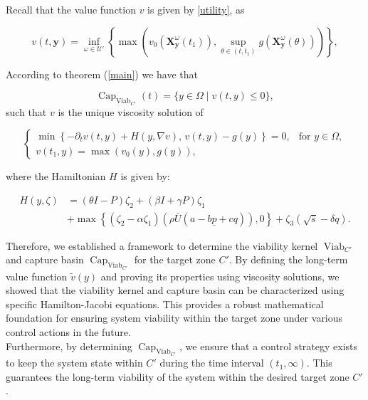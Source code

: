 \documentclass[]{interact}
\theoremstyle{plain}%
\theoremstyle{definition}
\theoremstyle{remark}
\begin{document}
Recall that the value function $v$ is given by \ref{utility}, as 

\begin{equation*}
v(t, \mathbf{y}) = \inf_{\omega \in \mathcal{U'}}\left\{ \max \left(  v_0(\mathbf{X}_{\mathbf{y}}^\omega(t_1)), \sup_{\theta \in (t, t_1)} g\left(\mathbf{X}_{\mathbf{y}}^\omega(\theta)\right) \right)  \right\},
\end{equation*}

According to theorem (\ref{main}) we have that 

\[ 
\operatorname{Cap}_{\operatorname{Viab}_{C'}}(t) = \{y  \in \Omega \mid v(t, y) \leq 0\},
\]
such that $v$ is the unique viscosity solution of

\begin{equation} \label{HJB2}
\begin{cases}
    \min \left\{ -\partial_{t} v(t,y) + H(y, \nabla v), \, v(t, y) - g(y) \right\} = 0, & \text{for } y \in \Omega, \\
    v(t_{1},y) = \max(v_{0}(y), g(y)),
\end{cases}
\end{equation}


where the Hamiltonian \( H \) is given by:

\begin{align*}
  H(y, \zeta) & = (\theta I - P) \zeta_2 + (\beta I + \gamma P) \zeta_1 \\
  &+ \max \left\{ \left( \zeta_2 - \alpha \zeta_1 \right) (\rho \bar{U} (a - b \underline{p} + cq)), 0 \right\} + \zeta_3 \left( \sqrt{\bar{s}} - \delta q \right).  
\end{align*}

Therefore, we established a framework to determine the viability kernel \(\operatorname{Viab}_{C'}\) and capture basin \(\operatorname{Cap}_{\operatorname{Viab}_{C'}}\) for the target zone \(C'\). By defining the long-term value function \(\tilde{v}(y)\) and proving its properties using viscosity solutions, we showed that the viability kernel and capture basin can be characterized using specific Hamilton-Jacobi equations. This provides a robust mathematical foundation for ensuring system viability within the target zone under various control actions in the future.\\
Furthermore, by determining \(\operatorname{Cap}_{\operatorname{Viab}_{C'}}\), we ensure that a control strategy exists to keep the system state within \(C'\) during the time interval \((t_1, \infty)\). This guarantees the long-term viability of the system within the desired target zone \(C'\).
\end{document}
